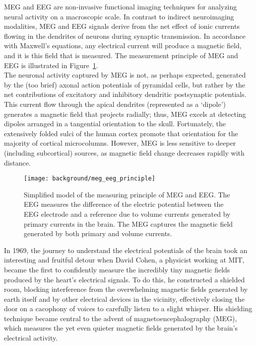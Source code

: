 MEG and EEG are non-invasive functional imaging techniques for analyzing neural activity on a macroscopic scale. In contrast to indirect neuroimaging modalities, MEG and EEG signals derive from the net effect of ionic currents flowing in the dendrites of neurons during synaptic transmission. In accordance with Maxwell's equations, any electrical current will produce a magnetic field, and it is this field that is measured. The measurement principle of MEG and EEG is illustrated in Figure~\ref{fig:meg_eeg_principle}.\\

The neuronal activity captured by MEG is not, as perhaps expected, generated by the (too brief) axonal action potentials of pyramidal cells, but rather by the net contributions of excitatory and inhibitory dendritic postsynaptic potentials. This current flow through the apical dendrites (represented as a ‘dipole’) generates a magnetic field that projects radially; thus, MEG excels at detecting dipoles arranged in a tangential orientation to the skull. Fortunately, the extensively folded sulci of the human cortex promote that orientation for the majority of cortical microcolumns. However, MEG is less sensitive to deeper (including subcortical) sources, as magnetic field change decreases rapidly with distance.\\

\begin{figure}
	\texttt{[image: background/meg\_eeg\_principle]}
    \caption{Simplified model of the measuring principle of MEG and EEG. The EEG measures the difference of the electric potential between the EEG electrode and a reference due to volume currents generated by primary currents in the brain. The
MEG captures the magnetic field generated by both primary and volume currents.
    }
    \label{fig:meg_eeg_principle}
\end{figure}

In 1969, the journey to understand the electrical potentials of the brain took an interesting and fruitful detour when David Cohen, a physicist working at MIT, became the first to confidently measure the incredibly tiny magnetic fields produced by the heart's electrical signals. To do this, he constructed a shielded room, blocking interference from the overwhelming magnetic fields generated by earth itself and by other electrical devices in the vicinity, effectively closing the door on a cacophony of voices to carefully listen to a slight whisper. His shielding technique became central to the advent of magnetoencephalography (MEG), which measures the yet even quieter magnetic fields generated by the brain's electrical activity.\\

